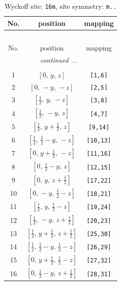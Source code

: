 \documentclass[fleqn,8pt]{jsarticle}
\begin{document}
\renewcommand{\arraystretch}{1.2}
\begin{longtable}{ccc}
\caption{Wyckoff site: {\tt 16m}, site symmetry: {\tt m..}}
 \\
 \hline \hline
No. & position & mapping \\ \hline \endfirsthead

\multicolumn{2}{l}{\tablename\ \thetable{}} \\
 \hline \hline
No. & position & mapping \\ \hline \endhead

 \hline \hline
\multicolumn{2}{r}{\footnotesize\it continued ...} \\ \endfoot

 \hline \hline
\multicolumn{2}{r}{} \\ \endlastfoot

1 & $\left[ 0,\, y,\, z \right]$ & {\tt [1,6]} \\ \hline
2 & $\left[ 0,\, - y,\, - z \right]$ & {\tt [2,5]} \\ \hline
3 & $\left[ \frac{1}{2},\, y,\, - z \right]$ & {\tt [3,8]} \\ \hline
4 & $\left[ \frac{1}{2},\, - y,\, z \right]$ & {\tt [4,7]} \\ \hline
5 & $\left[ \frac{1}{2},\, y + \frac{1}{2},\, z \right]$ & {\tt [9,14]} \\ \hline
6 & $\left[ \frac{1}{2},\, \frac{1}{2} - y,\, - z \right]$ & {\tt [10,13]} \\ \hline
7 & $\left[ 0,\, y + \frac{1}{2},\, - z \right]$ & {\tt [11,16]} \\ \hline
8 & $\left[ 0,\, \frac{1}{2} - y,\, z \right]$ & {\tt [12,15]} \\ \hline
9 & $\left[ 0,\, y,\, z + \frac{1}{2} \right]$ & {\tt [17,22]} \\ \hline
10 & $\left[ 0,\, - y,\, \frac{1}{2} - z \right]$ & {\tt [18,21]} \\ \hline
11 & $\left[ \frac{1}{2},\, y,\, \frac{1}{2} - z \right]$ & {\tt [19,24]} \\ \hline
12 & $\left[ \frac{1}{2},\, - y,\, z + \frac{1}{2} \right]$ & {\tt [20,23]} \\ \hline
13 & $\left[ \frac{1}{2},\, y + \frac{1}{2},\, z + \frac{1}{2} \right]$ & {\tt [25,30]} \\ \hline
14 & $\left[ \frac{1}{2},\, \frac{1}{2} - y,\, \frac{1}{2} - z \right]$ & {\tt [26,29]} \\ \hline
15 & $\left[ 0,\, y + \frac{1}{2},\, \frac{1}{2} - z \right]$ & {\tt [27,32]} \\ \hline
16 & $\left[ 0,\, \frac{1}{2} - y,\, z + \frac{1}{2} \right]$ & {\tt [28,31]} \\
\end{longtable}
\end{document}
